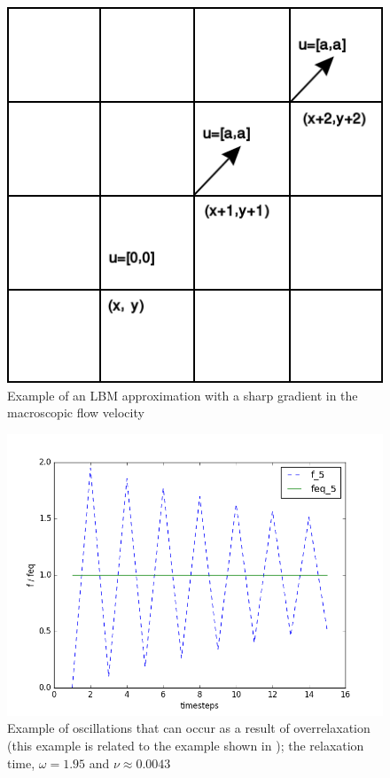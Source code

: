 \documentclass{article}
\begin{document}
\begin{figure}
    \includegraphics[width=\linewidth]{figs/sharp_gradient}
    \caption{Example of an LBM approximation with a sharp gradient in the macroscopic flow velocity}
    \label{fig:sharp-grad}
\end{figure}

\begin{figure}
    \includegraphics[width=\linewidth]{figs/overrelaxation_tau-0513}
    \caption{Example of oscillations that can occur as a result of overrelaxation (this example is related to the example shown in ); the relaxation time, $\omega = 1.95$ and $\nu \approx 0.0043$}
    \label{fig:overrelaxation}
\end{figure}
\end{document}
